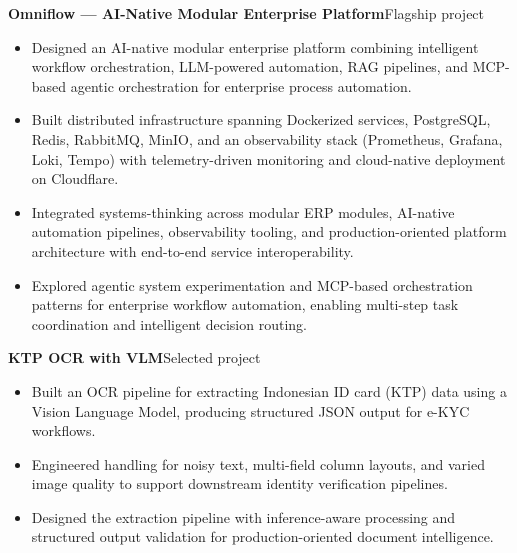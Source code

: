 
\textbf{Omniflow --- AI-Native Modular Enterprise Platform}\hfill {\color{SecondaryText}\small Flagship project}\par
\begin{itemize}
  \item Designed an AI-native modular enterprise platform combining intelligent workflow orchestration, LLM-powered automation, RAG pipelines, and MCP-based agentic orchestration for enterprise process automation.
  \item Built distributed infrastructure spanning Dockerized services, PostgreSQL, Redis, RabbitMQ, MinIO, and an observability stack (Prometheus, Grafana, Loki, Tempo) with telemetry-driven monitoring and cloud-native deployment on Cloudflare.
  \item Integrated systems-thinking across modular ERP modules, AI-native automation pipelines, observability tooling, and production-oriented platform architecture with end-to-end service interoperability.
  \item Explored agentic system experimentation and MCP-based orchestration patterns for enterprise workflow automation, enabling multi-step task coordination and intelligent decision routing.
\end{itemize}

\newpage
\textbf{KTP OCR with VLM}\hfill {\color{SecondaryText}\small Selected project}\par
\begin{itemize}
  \item Built an OCR pipeline for extracting Indonesian ID card (KTP) data using a Vision Language Model, producing structured JSON output for e-KYC workflows.
  \item Engineered handling for noisy text, multi-field column layouts, and varied image quality to support downstream identity verification pipelines.
  \item Designed the extraction pipeline with inference-aware processing and structured output validation for production-oriented document intelligence.
\end{itemize}

